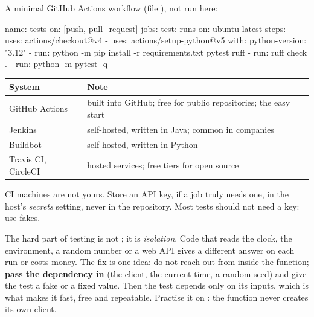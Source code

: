 A minimal GitHub Actions workflow (file ), not run here:

\begin{rawcode}
name: tests
on: [push, pull_request]
jobs:
  test:
    runs-on: ubuntu-latest
    steps:
      - uses: actions/checkout@v4
      - uses: actions/setup-python@v5
        with:
          python-version: "3.12"
      - run: python -m pip install -r requirements.txt pytest ruff
      - run: ruff check .
      - run: python -m pytest -q
\end{rawcode}

\begin{center}
\begin{tabularx}{\linewidth}{@{}l X@{}}
\toprule
\textbf{System} & \textbf{Note} \\
\midrule
GitHub Actions & built into GitHub; free for public repositories; the easy start \\
Jenkins & self-hosted, written in Java; common in companies \\
Buildbot & self-hosted, written in Python \\
Travis CI, CircleCI & hosted services; free tiers for open source \\
\bottomrule
\end{tabularx}
\end{center}

\begin{gamerule}
CI machines are not yours. Store an API key, if a job truly needs one, in the host's \emph{secrets} setting, never in the repository.
Most tests should not need a key: use fakes.
\end{gamerule}

\begin{boss}
The hard part of testing is not ; it is \emph{isolation}. Code that reads the clock, the environment, a random
number or a web API gives a different answer on each run or costs money. The fix is one idea: do not reach out from inside
the function; \textbf{pass the dependency in} (the client, the current time, a random seed) and give the test a fake or a fixed value.
Then the test depends only on its inputs, which is what makes it fast, free and repeatable. Practise it on :
the function never creates its own client.
\end{boss}

